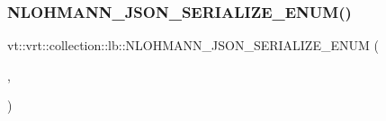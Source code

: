 \subsubsection{\texorpdfstring{N\+L\+O\+H\+M\+A\+N\+N\+\_\+\+J\+S\+O\+N\+\_\+\+S\+E\+R\+I\+A\+L\+I\+Z\+E\+\_\+\+E\+N\+U\+M()}{NLOHMANN\_JSON\_SERIALIZE\_ENUM()}}
{\footnotesize\ttfamily vt\+::vrt\+::collection\+::lb\+::\+N\+L\+O\+H\+M\+A\+N\+N\+\_\+\+J\+S\+O\+N\+\_\+\+S\+E\+R\+I\+A\+L\+I\+Z\+E\+\_\+\+E\+N\+UM (\begin{DoxyParamCaption}\item[{\hyperlink{namespacevt_1_1vrt_1_1collection_1_1lb_a74989c7b4dd16fcc067e90a29cd1febe}{Statistic\+Quantity}}]{,  }\item[{\{ \{\hyperlink{namespacevt_1_1vrt_1_1collection_1_1lb_a74989c7b4dd16fcc067e90a29cd1febead8bd79cc131920d5de426f914d17405a}{Statistic\+Quantity\+::min}, \char`\"{}min\char`\"{}\}, \{Statistic\+Quantity\+::max, \char`\"{}max\char`\"{}\}, \{Statistic\+Quantity\+::avg, \char`\"{}avg\char`\"{}\}, \{Statistic\+Quantity\+::std, \char`\"{}std\char`\"{}\}, \{Statistic\+Quantity\+::var, \char`\"{}var\char`\"{}\}, \{Statistic\+Quantity\+::skw, \char`\"{}skw\char`\"{}\}, \{Statistic\+Quantity\+::kur, \char`\"{}kur\char`\"{}\}, \{Statistic\+Quantity\+::car, \char`\"{}car\char`\"{}\}, \{Statistic\+Quantity\+::imb, \char`\"{}imb\char`\"{}\}, \{Statistic\+Quantity\+::npr, \char`\"{}npr\char`\"{}\}, \{Statistic\+Quantity\+::sum, \char`\"{}sum\char`\"{}\}, \}}]{ }\end{DoxyParamCaption})}

